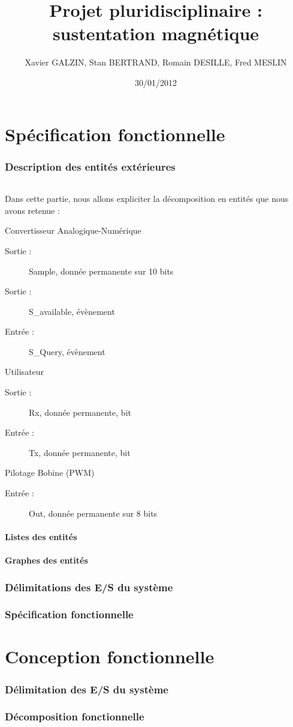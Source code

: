 \documentclass[11pt, french]{article} %
\title{Projet pluridisciplinaire : sustentation magnétique}
\author{ Xavier GALZIN, Stan BERTRAND, Romain DESILLE, Fred MESLIN}
\date{30/01/2012}
\begin{document}
\maketitle
\pagebreak


\part{Spécification fonctionnelle}

\section{Description des entités extérieures}
\paragraph{} Dans cette partie, nous allons expliciter la décomposition en entités que nous avons retenue :

Convertisseur Analogique-Numérique
\begin{description}
\item[Sortie : ]Sample, donnée permanente sur 10 bits
\item[Sortie : ]S\_available, évènement
\item[Entrée : ]S\_Query, évènement
\end{description}

Utilisateur
\begin{description}
\item[Sortie : ]Rx, donnée permanente, bit
\item[Entrée : ]Tx, donnée permanente, bit
\end{description}

Pilotage Bobine (PWM)
\begin{description}
\item[Entrée : ]Out, donnée permanente sur 8 bits
\end{description}



\subsection{Listes des entités}
\subsection{Graphes des entités}
\section{Délimitations des E/S du système}
\section{Spécification fonctionnelle}



\part{Conception fonctionnelle}
\section{Délimitation des E/S du système}
\section{Décomposition fonctionnelle}





%
%
\end{document}
